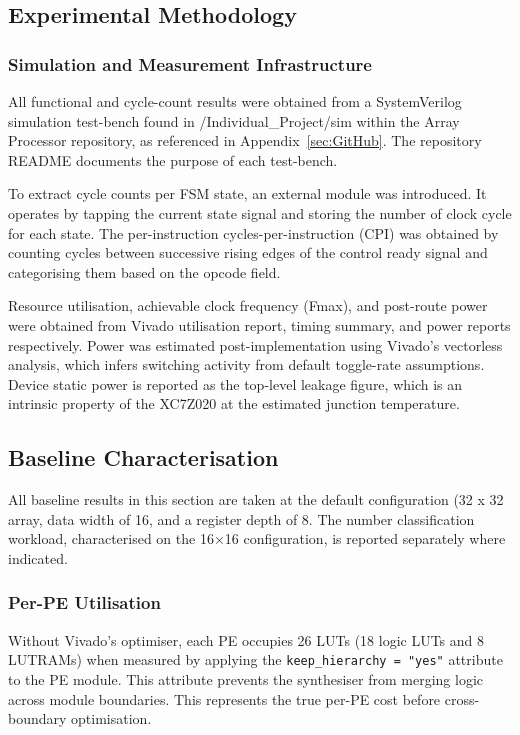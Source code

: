     \subsection{Experimental Methodology}
    \label{sec:Expmethodology}
    
        \subsubsection{Simulation and Measurement Infrastructure} All functional and cycle-count results were obtained from a SystemVerilog simulation test-bench found in /Individual\_Project/sim within the Array Processor repository, as referenced in Appendix~\ref{sec:GitHub}. The repository README documents the purpose of each test-bench.
    
        To extract cycle counts per FSM state, an external module was introduced. It operates by tapping the current state signal and storing the number of clock cycle for each state. The per-instruction cycles-per-instruction (CPI) was obtained by counting cycles between successive rising edges of the control ready signal and categorising them based on the opcode field.
    
        Resource utilisation, achievable clock frequency (Fmax), and post-route power were obtained from Vivado utilisation report, timing summary, and power reports respectively. Power was estimated post-implementation using Vivado's vectorless analysis, which infers switching activity from default toggle-rate assumptions. Device static power is reported as the top-level leakage figure, which is an intrinsic property of the XC7Z020 at the estimated junction temperature.

    \subsection{Baseline Characterisation}
    \label{sec:baseline}
        All baseline results in this section are taken at the default configuration (32 x 32 array, data width of 16, and a register depth of 8. The number classification workload, characterised on the 16×16 configuration, is reported separately where indicated.

    \subsubsection{Per-PE Utilisation}
        Without Vivado's optimiser, each PE occupies 26 LUTs (18 logic LUTs and 8 LUTRAMs) when measured by applying the \texttt{keep\_hierarchy = "yes"} attribute to the PE module. This attribute prevents the synthesiser from merging logic across module boundaries. This represents the true per-PE cost before cross-boundary optimisation.
    
